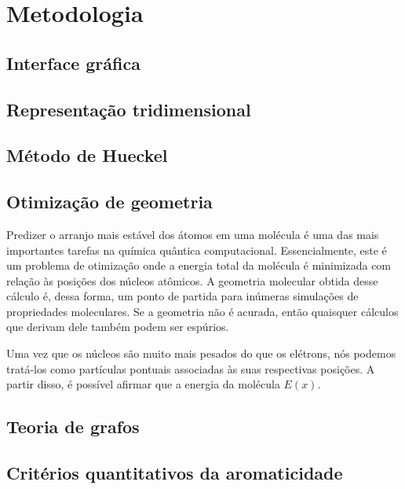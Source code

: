 \chapter{Metodologia
}\label{cap:desenvolvimento}
\section{Interface gráfica}

\section{Representação tridimensional}

\section{Método de Hueckel}

\section{Otimização de geometria}

Predizer o arranjo mais estável dos átomos em uma molécula é uma das mais importantes tarefas na química quântica computacional. Essencialmente, este é um problema de otimização onde a energia total da molécula é minimizada com relação às posições dos núcleos atômicos. A geometria molecular obtida desse cálculo é, dessa forma, um ponto de partida para inúmeras simulações de propriedades moleculares. Se a geometria não é acurada, então quaisquer cálculos que derivam dele também podem ser espúrios.

Uma vez que os núcleos são muito mais pesados do que os elétrons, nós podemos tratá-los como partículas pontuais associadas às suas respectivas posições. A partir disso, é possível afirmar que a energia da molécula $E(x)$.

\section{Teoria de grafos}

\section{Critérios quantitativos da aromaticidade}


